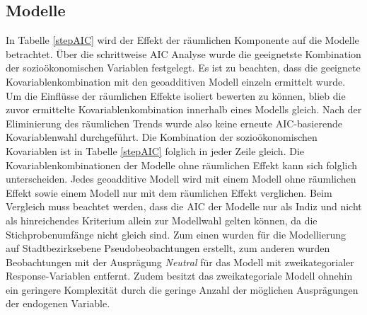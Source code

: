 \documentclass{Vorlage}
\begin{document}
\subsection{Modelle}
In Tabelle \ref{stepAIC} wird der Effekt der räumlichen Komponente auf die Modelle betrachtet. Über die schrittweise AIC Analyse wurde die geeignetste Kombination der sozioökonomischen Variablen festgelegt. Es ist zu beachten, dass die geeignete Kovariablenkombination mit den geoadditiven Modell einzeln ermittelt wurde. Um die Einflüsse der räumlichen Effekte isoliert bewerten zu können, blieb die zuvor ermittelte Kovariablenkombination innerhalb eines Modells gleich. Nach der Eliminierung des räumlichen Trends wurde also keine erneute AIC-basierende Kovariablenwahl durchgeführt. Die Kombination der sozioökonomischen Kovariablen ist in Tabelle \ref{stepAIC} folglich in jeder Zeile gleich. Die Kovariablenkombinationen der Modelle ohne räumlichen Effekt kann sich folglich unterscheiden. Jedes geoadditive Modell wird mit einem Modell ohne räumlichen Effekt sowie einem Modell nur mit dem räumlichen Effekt verglichen. Beim Vergleich muss beachtet werden, dass die AIC der Modelle nur als Indiz und nicht als hinreichendes Kriterium allein zur Modellwahl gelten können, da die Stichprobenumfänge nicht gleich sind. Zum einen wurden für die Modellierung auf Stadtbezirksebene Pseudobeobachtungen erstellt, zum anderen wurden Beobachtungen mit der Ausprägung \textit{Neutral} für das Modell mit zweikategorialer Response-Variablen entfernt. Zudem besitzt das zweikategoriale Modell ohnehin ein geringere Komplexität durch die geringe Anzahl der möglichen Ausprägungen der endogenen Variable.
\end{document}
